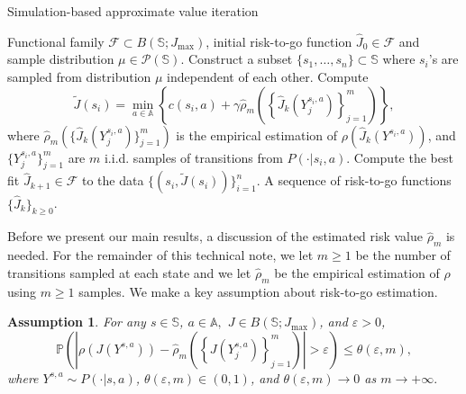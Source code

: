 \documentclass[12pt,technote,onecolumn]{IEEEtran}
\newtheorem{assumption}{Assumption}
\begin{document}
\begin{algorithm}[!tph] 	 	 	 	 		 		
	\caption{Simulation-based approximate value iteration} \label{algo}	 	 	 	 		 		
	\begin{algorithmic}[1] 	
	\renewcommand{\algorithmicrequire}{\textbf{Input:}}
	\renewcommand{\algorithmicensure}{\textbf{Output:}}	 		 		 		 			 		
	\REQUIRE Functional family $\mathcal{F}\subset B\left(\mathbb{S};J_{\max}\right)$, initial risk-to-go function $\widehat{J}_0\in \mathcal{F}$ and sample distribution $\mu\in\mathcal{P}\left(\mathbb{S}\right)$.  	
	\STATE Construct a subset $\{s_1,\dots, s_n\}\subset\mathbb{S}$ where $s_i$'s  are sampled  from distribution $\mu$ independent of each other.		 		 		 			 			
	\STATE Compute
	\begin{equation*}
	\widetilde{J}(s_i)=\min_{a\in\mathbb{A}}\left\{c(s_i,a)+\gamma\hat{\rho}_{m}\left(\left\{\widehat{J}_k\left(Y_j^{s_i,a}\right)\right\}^m_{j=1}\right)\right\}, 
	\end{equation*}		 		 		
	where $\hat{\rho}_{m}(\{\widehat{J}_k(Y_j^{s_i,a})\}^m_{j=1})$ is the empirical estimation of $\rho(\widehat{J}_k(Y^{s_i,a}))$, and $\{Y_j^{s_i,a}\}_{j=1}^m$ are $m$ i.i.d. samples of  transitions from $P(\cdot|s_i,a)$. 		 			 			
	\ENDFOR 		 		 		 			 			
	\STATE Compute the best fit $\widehat{J}_{k+1}\in\mathcal{F}$ to the data  $\{(s_i,\widetilde{J}(s_i))\}_{i=1}^n$.	
	\ENDFOR 		 		 		 			 			
	\ENSURE A sequence of risk-to-go functions $\{\widehat{J}_k\}_{k\geq0}$.  	 	 	 	 		 		
	\end{algorithmic}     	 	
\end{algorithm}	    	 	

Before we present our main results, a discussion of the
estimated risk value $\hat{\rho}_{m}$ is needed. For the remainder
of this technical note, we let $m\geq1$ be the number of transitions sampled
at each state and we let $\hat{\rho}_{m}$ be the empirical estimation
of $\rho$ using $m\geq1$ samples. We make a key assumption about
risk-to-go estimation. 
\begin{assumption}
	\label{assu:Risk_estimation} For any $s\in\mathbb{{S}}$,
	$a\in\mathbb{A},$ $J\in B\left(\mathbb{S};J_{\max}\right)$, and
	$\varepsilon>0$,	
	\[
	\mathbb{P}\left(\left|\rho\left(J\left(Y^{s,a}\right)\right)-\hat{\rho}_{m}\left(\left\{J\left(Y_j^{s,a}\right)\right\}^m_{j=1}\right)\right|>\varepsilon\right)\leq\theta\left(\varepsilon,m\right),
	\]
	where $Y^{s,a}\sim P\left(\cdot\vert s,a\right)$, $\theta\left(\varepsilon,m\right)\in\left(0,1\right)$,
	and $\theta\left(\varepsilon,m\right)\rightarrow0$ as $m\rightarrow+\infty.$
\end{assumption}
\end{document}
